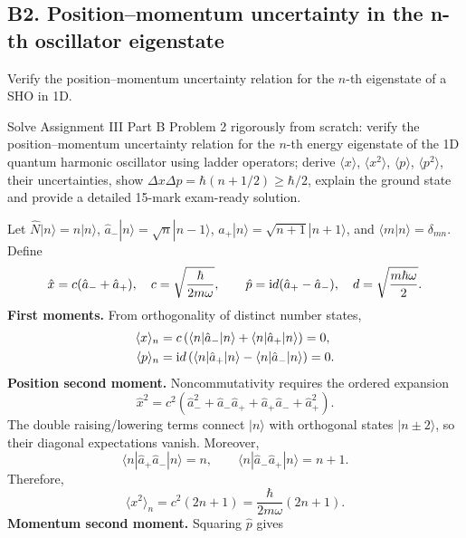 \documentclass[11pt,a4paper]{article}
\newcommand{\avg}[1]{\langle #1\rangle}\newcommand{\Sch}{Schr\"odinger}
\newcommand{\bra}[1]{\langle #1|}\newcommand{\ket}[1]{|#1\rangle}
\newcommand{\braket}[2]{\langle #1|#2\rangle}
\begin{document}
\subsection{B2. Position--momentum uncertainty in the n-th oscillator eigenstate}
\begin{questionbox}
Verify the position--momentum uncertainty relation for the \(n\)-th eigenstate of a SHO in 1D.
\end{questionbox}
\begin{studybox}
Solve Assignment III Part B Problem 2 rigorously from scratch: verify the position--momentum uncertainty relation for the \(n\)-th energy eigenstate of the 1D quantum harmonic oscillator using ladder operators; derive \(\langle x\rangle\), \(\langle x^2\rangle\), \(\langle p\rangle\), \(\langle p^2\rangle\), their uncertainties, show \(\Delta x\Delta p=\hbar(n+1/2)\ge\hbar/2\), explain the ground state and provide a detailed 15-mark exam-ready solution.
\end{studybox}
Let \(\hat N\ket n=n\ket n\), \(\hat a_-\ket n=\sqrt n\ket{n-1}\), \(\hat a_+\ket n=\sqrt{n+1}\ket{n+1}\), and \(\braket mn=\delta_{mn}\). Define
\begin{equation}
\hat x=c(\hat a_-+\hat a_+),\quad c=\sqrt{\frac{\hbar}{2m\omega}},\qquad
\hat p=\mathrm{i} d(\hat a_+-\hat a_-),\quad d=\sqrt{\frac{m\hbar\omega}{2}}.
\end{equation}
\textbf{First moments.} From orthogonality of distinct number states,
\begin{align}
\avg x_n&=c\left(\bra n\hat a_-\ket n+\bra n\hat a_+\ket n\right)=0,\\
\avg p_n&=\iu d\left(\bra n\hat a_+\ket n-\bra n\hat a_-\ket n\right)=0.
\end{align}
\textbf{Position second moment.} Noncommutativity requires the ordered expansion
\begin{equation}
\hat x^2=c^2\left(\hat a_-^2+\hat a_-\hat a_++\hat a_+\hat a_-+\hat a_+^2\right).
\end{equation}
The double raising/lowering terms connect \(\ket n\) with orthogonal states \(\ket{n\pm2}\), so their diagonal expectations vanish. Moreover,
\begin{equation}\bra n\hat a_+\hat a_-\ket n=n,\qquad\bra n\hat a_-\hat a_+\ket n=n+1.\end{equation}
Therefore,
\begin{equation}\boxed{\avg{x^2}_n=c^2(2n+1)=\frac{\hbar}{2m\omega}(2n+1).}\end{equation}
\textbf{Momentum second moment.} Squaring \(\hat p\) gives
\end{document}
